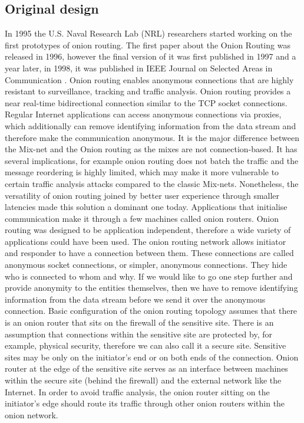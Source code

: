 \subsection{Original design}
In 1995 the U.S. Naval Research Lab (NRL) researchers started working on the first prototypes of onion routing.  The first paper about the Onion Routing was released in 1996, however the final version of it was first published in 1997 and a year later, in 1998, it was published in IEEE Journal on Selected Areas in Communication \cite{onion-routing98}.
Onion routing enables anonymous connections that are highly resistant to surveillance, tracking and traffic analysis. Onion routing provides a near real-time bidirectional connection similar to the TCP socket connections. Regular Internet applications can access anonymous connections via proxies, which additionally can remove identifying information from the data stream and therefore make the communication anonymous.
It is the major difference between the Mix-net and the Onion routing as the mixes are not connection-based. It has several implications, for example onion routing does not batch the traffic and the message reordering is highly limited, which may make it more vulnerable to certain traffic analysis attacks compared to the classic Mix-nets. Nonetheless, the versatility of onion routing joined by better user experience through smaller latencies made this solution a dominant one today.
Applications that initialise communication make it through a few machines called onion routers. Onion routing was designed to be application independent, therefore a wide variety of applications could have been used. The onion routing network allows initiator and responder to have a connection between them. These connections are called anonymous socket connections, or simpler, anonymous connections. They hide who is connected to whom and why. If we would like to go one step further and provide anonymity to the entities themselves, then we have to remove identifying information from the data stream before we send it over the anonymous connection.
Basic configuration of the onion routing topology assumes that there is an onion router that sits on the firewall of the sensitive site. There is an assumption that connections within the sensitive site are protected by, for example, physical security, therefore we can also call it a secure site. Sensitive sites may be only on the initiator’s end or on both ends of the connection. Onion router at the edge of the sensitive site serves as an interface between machines within the secure site (behind the firewall) and the external network like the Internet. In order to avoid traffic analysis, the onion router sitting on the initiator’s edge should route its traffic through other onion routers within the onion network.
